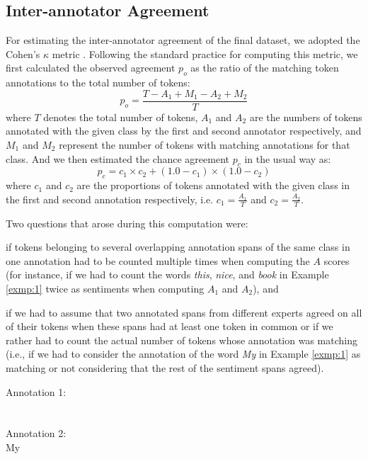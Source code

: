 \subsection{Inter-annotator Agreement}\label{subsec:snt:iaa}
For estimating the inter-annotator agreement of the final dataset, we
adopted the Cohen's $\kappa$ metric \cite{Cohen:60}.  Following the
standard practice for computing this metric, we first calculated the
observed agreement $p_o$ as the ratio of the matching token
annotations to the total number of tokens:
\begin{equation*}\textstyle
  p_o = \frac{T - A_1 + M_1 - A_2 + M_2}{T}
\end{equation*}
where $T$ denotes the total number of tokens, $A_1$ and $A_2$ are the
numbers of tokens annotated with the given class by the first and
second annotator respectively, and $M_1$ and $M_2$ represent the
number of tokens with matching annotations for that class.  And we
then estimated the chance agreement $p_c$ in the usual way as:
\begin{equation*}\textstyle
  p_c = c_1 \times c_2 + (1.0 - c_1) \times (1.0 - c_2)
\end{equation*}
where $c_1$ and $c_2$ are the proportions of tokens annotated with the
given class in the first and second annotation respectively, i.e. $c_1
= \frac{A_1}{T}$ and $c_2 = \frac{A_2}{T}$.

Two questions that arose during this computation were:
\begin{inparaenum}
\item if tokens belonging to several overlapping annotation spans of
  the same class in one annotation had to be counted multiple times
  when computing the $A$ scores (for instance, if we had to count
  the words \textit{this}, \textit{nice}, and \textit{book} in
  Example \ref{exmp:1} twice as sentiments when computing $A_1$ and
  $A_2$), and
\item if we had to assume that two annotated spans from different
  experts agreed on all of their tokens when these spans had at
  least one token in common or if we rather had to count the actual
  number of tokens whose annotation was matching (i.e., if we had to
  consider the annotation of the word \textit{My} in Example
  \ref{exmp:1} as matching or not considering that the rest of the
  sentiment spans agreed).
\end{inparaenum}

\begin{example}\label{exmp:1}
  \textrm{Annotation 1:}\\ \\\\ \textrm{Annotation 2:}\\ My 
\end{example}

